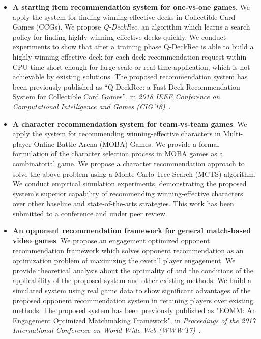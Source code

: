 \begin{itemize}
\item \textbf{A starting item recommendation system for one-vs-one games}. We apply the system for finding  winning-effective decks in Collectible Card Games (CCGs). We propose \textit{Q-DeckRec}, an algorithm which learns a
search policy for finding highly winning-effective decks quickly. We conduct experiments to show that after a training phase Q-DeckRec is
able to build a highly winning-effective deck for each deck recommendation request within CPU time short enough for large-scale or real-time application, which is not achievable by existing solutions. The proposed recommendation system has been previously published as ``Q-DeckRec: a Fast Deck Recommendation System for Collectible Card Games'', in \textit{2018 IEEE Conference on Computational Intelligence and Games (CIG'18)}~\cite{chenqdeckrec}.
\item \textbf{A character recommendation system for team-vs-team games}. We apply the system for recommending winning-effective characters in Multi-player Online Battle Arena (MOBA) Games. We provide a formal formulation of the character selection process in MOBA games as a combinatorial game. We propose a character recommendation approach to solve the above problem using a Monte Carlo Tree Search (MCTS) algorithm. We conduct empirical simulation experiments, demonstrating the proposed system's superior capability of recommending winning-effective characters over other baseline and state-of-the-arts strategies. This work has been submitted to a conference and under peer review.
\item \textbf{An opponent recommendation framework for general match-based video games}. We
propose an engagement optimized opponent recommendation framework which solves opponent recommendation as an optimization problem of maximizing the overall player engagement. We provide theoretical analysis about the optimality of and the conditions of the applicability of the proposed system and other existing methods. We build a simulated system using real game data to show significant advantages of the proposed opponent recommendation system in retaining players over existing methods. The proposed system has been previously published as "EOMM: An Engagement Optimized Matchmaking Framework", in \textit{Proceedings of the 2017 International Conference on World Wide Web (WWW'17)}~\cite{chen2017eomm}.
\end{itemize}


